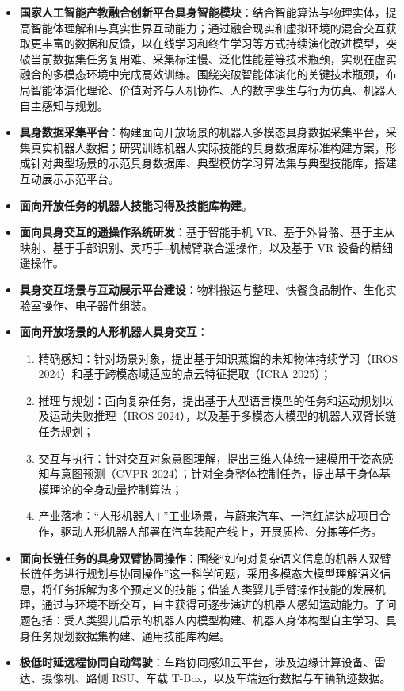 \begin{itemize}[itemsep=3pt]
    \item \textbf{国家人工智能产教融合创新平台具身智能模块}：结合智能算法与物理实体，提高智能体理解和与真实世界互动能力；通过融合现实和虚拟环境的混合交互获取更丰富的数据和反馈，以在线学习和终生学习等方式持续演化改进模型，突破当前数据集任务复用难、采集标注慢、泛化性能差等技术瓶颈，实现在虚实融合的多模态环境中完成高效训练。围绕突破智能体演化的关键技术瓶颈，布局智能体演化理论、价值对齐与人机协作、人的数字孪生与行为仿真、机器人自主感知与规划。
    \item \textbf{具身数据采集平台}：构建面向开放场景的机器人多模态具身数据采集平台，采集真实机器人数据；研究训练机器人实际技能的具身数据库标准构建方案，形成针对典型场景的示范具身数据库、典型模仿学习算法集与典型技能库，搭建互动展示示范平台。
    \item \textbf{面向开放任务的机器人技能习得及技能库构建}。
    \item \textbf{面向具身交互的遥操作系统研发}：基于智能手机 VR、基于外骨骼、基于主从映射、基于手部识别、灵巧手--机械臂联合遥操作，以及基于 VR 设备的精细遥操作。
    \item \textbf{具身交互场景与互动展示平台建设}：物料搬运与整理、快餐食品制作、生化实验室操作、电子器件组装。
    \item \textbf{面向开放场景的人形机器人具身交互}：
    \begin{enumerate}[itemsep=1pt]
        \item 精确感知：针对场景对象，提出基于知识蒸馏的未知物体持续学习（IROS 2024）和基于跨模态域适应的点云特征提取（ICRA 2025）；
        \item 推理与规划：面向复杂任务，提出基于大型语言模型的任务和运动规划以及运动失败推理（IROS 2024），以及基于多模态大模型的机器人双臂长链任务规划；
        \item 交互与执行：针对交互对象意图理解，提出三维人体统一建模用于姿态感知与意图预测（CVPR 2024）；针对全身整体控制任务，提出基于身体基模理论的全身动量控制算法；
        \item 产业落地：“人形机器人+”工业场景，与蔚来汽车、一汽红旗达成项目合作，驱动人形机器人部署在汽车装配产线上，开展质检、分拣等任务。
    \end{enumerate}
    \item \textbf{面向长链任务的具身双臂协同操作}：围绕“如何对复杂语义信息的机器人双臂长链任务进行规划与协同操作”这一科学问题，采用多模态大模型理解语义信息，将任务拆解为多个预定义的技能；借鉴人类婴儿手臂操作技能的发展机理，通过与环境不断交互，自主获得可逐步演进的机器人感知运动能力。子问题包括：受人类婴儿启示的机器人内模型构建、机器人身体构型自主学习、具身任务规划数据集构建、通用技能库构建。
    \item \textbf{极低时延远程协同自动驾驶}：车路协同感知云平台，涉及边缘计算设备、雷达、摄像机、路侧 RSU、车载 T-Box，以及车端运行数据与车辆轨迹数据。
\end{itemize}

